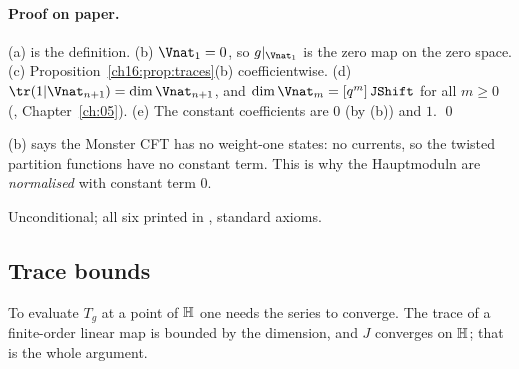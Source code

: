 \paragraph{Proof on paper.}  (a) is the definition.  (b) $\Vnat_1=0$, so $g|_{\Vnat_1}$ is the zero map on the zero
space.  (c) Proposition~\ref{ch16:prop:traces}(b) coefficientwise.  (d) $\tr(1|\Vnat_{n+1})=\dim\Vnat_{n+1}$, and
$\dim\Vnat_m=[q^m]\,\mathtt{JShift}$ for all $m\ge0$ (,
Chapter~\ref{ch:05}).  (e) The constant coefficients are $0$ (by (b)) and $1$. \qed
\begin{physics}
(b) says the Monster CFT has no weight-one states: no currents, so the twisted partition functions have no constant
term.  This is why the Hauptmoduln are \emph{normalised} with constant term $0$.
\end{physics}
\begin{status}
Unconditional; all six printed in , standard axioms.
\end{status}

\subsection{Trace bounds}

To evaluate $T_g$ at a point of $\mathbb{H}$ one needs the series to converge.  The trace of a finite-order linear
map is bounded by the dimension, and $J$ converges on $\mathbb{H}$; that is the whole argument.

